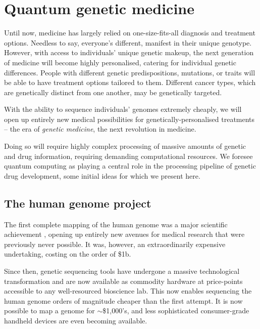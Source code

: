 %
%

\section{Quantum genetic medicine}

Until now, medicine has largely relied on one-size-fits-all diagnosis and treatment options. Needless to say, everyone's different, manifest in their unique genotype. However, with access to individuals' unique genetic makeup, the next generation of medicine will become highly personalised, catering for individual genetic differences. People with different genetic predispositions, mutations, or traits will be able to have treatment options tailored to them. Different cancer types, which are genetically distinct from one another, may be genetically targeted.

With the ability to sequence individuals' genomes extremely cheaply, we will open up entirely new medical possibilities for genetically-personalised treatments -- the era of \textit{genetic medicine}, the next revolution in medicine.

Doing so will require highly complex processing of massive amounts of genetic and drug information, requiring demanding computational resources. We foresee quantum computing as playing a central role in the processing pipeline of genetic drug development, some initial ideas for which we present here.

%
%

\subsection{The human genome project}

The first complete mapping of the human genome was a major scientific achievement \cite{humanGenomeProject}, opening up entirely new avenues for medical research that were previously never possible. It was, however, an extraordinarily expensive undertaking, costing on the order of \$1b.

Since then, genetic sequencing tools have undergone a massive technological transformation and are now available as commodity hardware at price-points accessible to any well-resourced bioscience lab. This now enables sequencing the human genome orders of magnitude cheaper than the first attempt. It is now possible to map a genome for $\sim$\$1,000's, and less sophisticated consumer-grade handheld devices are even becoming available.

